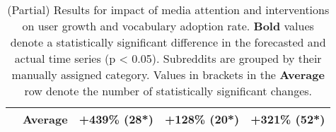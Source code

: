 \begin{table}[]
{\begin{tabular}{cllll}
				     & \textbf{Average}    & +439\% (28*) & +128\%  (20*)             & +321\%  (52*)  \\
\bottomrule
\end{tabular}%
}
\caption{\label{tab:h2-results} (Partial) Results for impact of media attention
and interventions on user growth and vocabulary adoption rate. \textbf{Bold}
values denote a statistically significant
difference in the forecasted and actual time series (p < 0.05).
Subreddits are grouped by their manually assigned category. Values in brackets
in the {\bf Average} row denote the number of statistically significant
changes.} 
\label{table:consequences:results}
\end{table}



